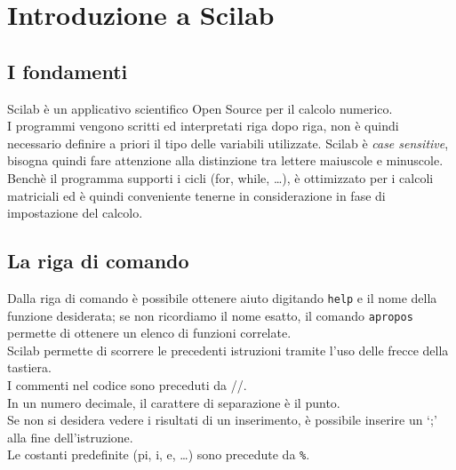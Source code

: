 
%

\chapter{Introduzione a Scilab}
\section{I fondamenti}
Scilab \`e un applicativo scientifico Open Source per il calcolo numerico.\\
I programmi vengono scritti ed interpretati riga dopo riga, non \`e quindi necessario definire a priori il tipo delle variabili utilizzate. Scilab \`e \emph{case sensitive}, bisogna quindi fare attenzione alla distinzione tra lettere maiuscole e minuscole.\\
Bench\`e il programma supporti i cicli (for, while, \dots), \`e ottimizzato per i calcoli matriciali ed \`e quindi conveniente tenerne in considerazione in fase di impostazione del calcolo.
\section{La riga di comando}
Dalla riga di comando \`e possibile ottenere aiuto digitando \verb+help+ e il nome della funzione desiderata; se non ricordiamo il nome esatto, il comando \verb+apropos+ permette di ottenere un elenco di funzioni correlate.\\
Scilab permette di scorrere le precedenti istruzioni tramite l'uso delle frecce della tastiera.\\
I commenti nel codice sono preceduti da //.\\
In un numero decimale, il carattere di separazione \`e il punto.\\
Se non si desidera vedere i risultati di un inserimento, \`e possibile inserire un `;' alla fine dell'istruzione.\\
Le costanti predefinite (pi, i, e, \ldots) sono precedute da \verb+%+.
